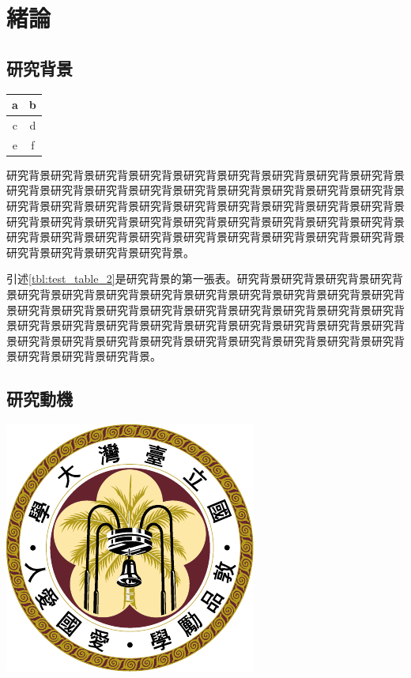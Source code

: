 
\chapter{緒論}

\section{研究背景}

\begingroup
\centering
\begin{tabular}{|c|c|}
\hline
a & b \\\hline
c & d \\\hline
e & f \\\hline
\hline
\end{tabular}
\captionsetup{type=table}
\label{tbl:test_table_2}

\endgroup

研究背景研究背景研究背景研究背景研究背景研究背景研究背景研究背景研究背景研究背景研究背景研究背景研究背景研究背景研究背景研究背景研究背景研究背景研究背景研究背景研究背景研究背景研究背景研究背景研究背景研究背景研究背景研究背景研究背景研究背景研究背景研究背景研究背景研究背景研究背景研究背景研究背景研究背景研究背景研究背景研究背景研究背景研究背景研究背景研究背景研究背景研究背景研究背景研究背景。\par

引述\ref{tbl:test_table_2}是研究背景的第一張表。研究背景研究背景研究背景研究背景研究背景研究背景研究背景研究背景研究背景研究背景研究背景研究背景研究背景研究背景研究背景研究背景研究背景研究背景研究背景研究背景研究背景研究背景研究背景研究背景研究背景研究背景研究背景研究背景研究背景研究背景研究背景研究背景研究背景研究背景研究背景研究背景研究背景研究背景研究背景研究背景研究背景研究背景研究背景。

\section{研究動機}
\begingroup
\centering
\includegraphics{figures/seal.pdf}
\captionsetup{type=figure}
\label{fig:test_fig_1}
\endgroup

